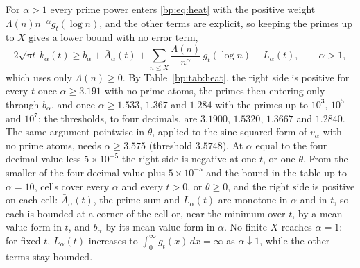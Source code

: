 For $\alpha>1$ every prime power enters \eqref{bp:eq:heat} with the positive weight $\Lambda(n)n^{-\alpha}g_t(\log n)$, and the other terms are explicit, so keeping the primes up to $X$ gives a lower bound with no error term,
\begin{equation}\label{bp:eq:heatlb}
2\sqrt{\pi t}\,k_\alpha(t)\ge b_\alpha+\bar A_\alpha(t)+\sum_{n\le X}\frac{\Lambda(n)}{n^\alpha}\,g_t(\log n)-L_\alpha(t),\qquad\alpha>1,
\end{equation}
which uses only $\Lambda(n)\ge0$. By Table~\ref{bp:tab:heat}, the right side is positive for every $t$ once $\alpha\ge3.191$ with no prime atoms, the primes then entering only through $b_\alpha$, and once $\alpha\ge1.533$, $1.367$ and $1.284$ with the primes up to $10^3$, $10^5$ and $10^7$; the thresholds, to four decimals, are $3.1900$, $1.5320$, $1.3667$ and $1.2840$. The same argument pointwise in $\theta$, applied to the sine squared form of $v_\alpha$ with no prime atoms, needs $\alpha\ge3.575$ (threshold $3.5748$). At $\alpha$ equal to the four decimal value less $5\times10^{-5}$ the right side is negative at one $t$, or one $\theta$. From the smaller of the four decimal value plus $5\times10^{-5}$ and the bound in the table up to $\alpha=10$, cells cover every $\alpha$ and every $t>0$, or $\theta\ge0$, and the right side is positive on each cell: $\bar A_\alpha(t)$, the prime sum and $L_\alpha(t)$ are monotone in $\alpha$ and in $t$, so each is bounded at a corner of the cell or, near the minimum over $t$, by a mean value form in $t$, and $b_\alpha$ by its mean value form in $\alpha$. No finite $X$ reaches $\alpha=1$: for fixed $t$, $L_\alpha(t)$ increases to $\int_0^\infty g_t(x)\,dx=\infty$ as $\alpha\downarrow1$, while the other terms stay bounded.

